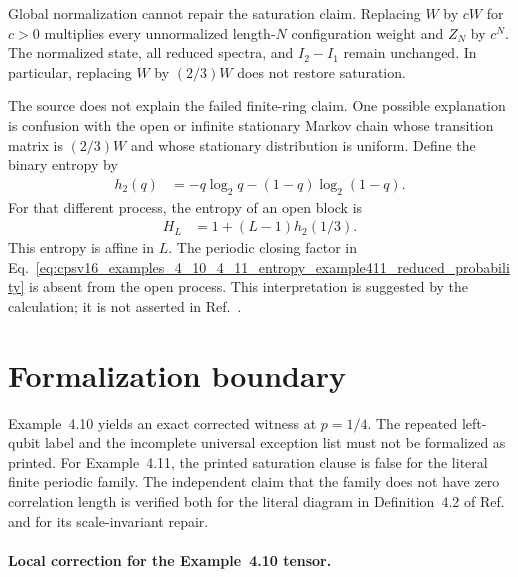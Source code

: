 \documentclass{article}
\begin{document}
Global normalization cannot repair the saturation claim. Replacing $W$ by
$cW$ for $c>0$ multiplies every unnormalized length-$N$ configuration weight
and $Z_N$ by $c^N$. The normalized state, all reduced spectra, and $I_2-I_1$
remain unchanged. In particular, replacing $W$ by $(2/3)W$ does not restore
saturation.

The source does not explain the failed finite-ring claim. One possible
explanation is confusion with the open or infinite stationary Markov chain
whose transition matrix is $(2/3)W$ and whose stationary distribution is
uniform. Define the binary entropy by
\begin{align}
    h_2(q)
        &= -q\log_2 q-(1-q)\log_2(1-q).
    \label{eq:cpsv16_examples_4_10_4_11_entropy_binary_entropy}
\end{align}
For that different process, the entropy of an open block is
\begin{align}
    H_L
        &= 1+(L-1)h_2(1/3).
    \label{eq:cpsv16_examples_4_10_4_11_entropy_open_markov_entropy}
\end{align}
This entropy is affine in $L$. The periodic closing factor in
Eq.~\ref{eq:cpsv16_examples_4_10_4_11_entropy_example411_reduced_probability}
is absent from the open process. This interpretation is suggested by the
calculation; it is not asserted in Ref.~\cite{Cirac2016MPDO_arXiv}.

\section{Formalization boundary}

Example~4.10 yields an exact corrected witness at $p=1/4$. The repeated
left-qubit label and the incomplete universal exception list must not be
formalized as printed. For Example~4.11, the printed saturation clause is
false for the literal finite periodic family. The independent claim that the
family does not have zero correlation length is verified both for the literal
diagram in Definition~4.2 of
Ref.~\cite[lines~735--739]{Cirac2016MPDO_arXiv} and for its scale-invariant
repair.

\paragraph{Local correction for the Example~4.10 tensor.}
\end{document}
